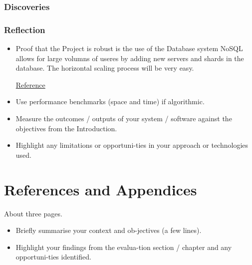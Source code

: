 \subsection{Discoveries}
\subsection{Reflection}


\begin{itemize}
\item  %


Proof that the Project is robust is the use of the Database system NoSQL allows for large volumns of useres by adding new servers and shards in the database. The horizontal scaling process will be very easy. 

\href{https://stackoverflow.com/questions/4386949/is-nosql-is-suitable-for-social-networking-kind-of-applications}{Reference}


\item Use performance benchmarks (space and time) if algorithmic.
\item Measure the outcomes / outputs of your system / software against the objectives from the Introduction.
\item Highlight any limitations or opportuni-ties in your approach or technologies used.
\end{itemize}

\chapter{References and Appendices}
About three pages.






\begin{itemize}
\item Briefly summarise your context and ob-jectives (a few lines).
\item Highlight your findings from the evalua-tion section / chapter and any opportuni-ties identified.
\end{itemize}



